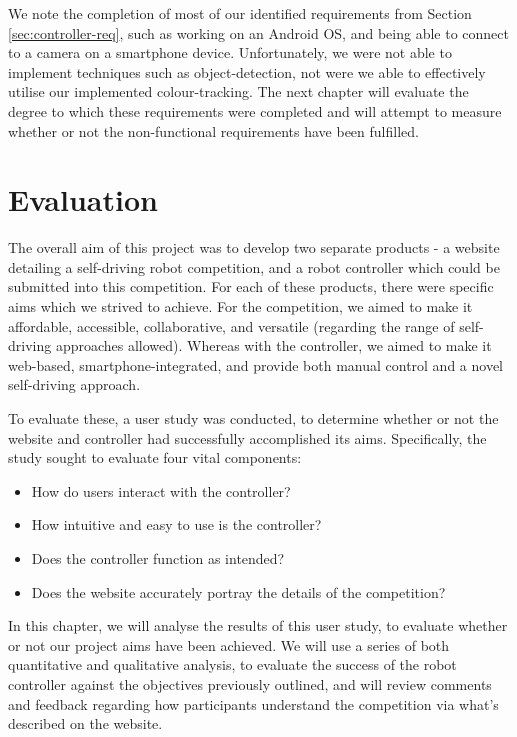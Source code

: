 \documentclass{l4proj}
\begin{document}
We note the completion of most of our identified requirements from Section \ref{sec:controller-req}, such as working on an Android OS, and being able to connect to a camera on a smartphone device. Unfortunately, we were not able to implement techniques such as object-detection, not were we able to effectively utilise our implemented colour-tracking. The next chapter will evaluate the degree to which these requirements were completed and will attempt to measure whether or not the non-functional requirements have been fulfilled.

\chapter{Evaluation}\label{sec:evaluation}
The overall aim of this project was to develop two separate products - a website detailing a self-driving robot competition, and a robot controller which could be submitted into this competition. For each of these products, there were specific aims which we strived to achieve. For the competition, we aimed to make it affordable, accessible, collaborative, and versatile (regarding the range of self-driving approaches allowed). Whereas with the controller, we aimed to make it web-based, smartphone-integrated, and provide both manual control and a novel self-driving approach.

To evaluate these, a user study was conducted, to determine whether or not the website and controller had successfully accomplished its aims. Specifically, the study sought to evaluate four vital components:
\begin{itemize}
    \item How do users interact with the controller?
    \item How intuitive and easy to use is the controller?
    \item Does the controller function as intended?
    \item Does the website accurately portray the details of the competition?
\end{itemize}

In this chapter, we will analyse the results of this user study, to evaluate whether or not our project aims have been achieved. We will use a series of both quantitative and qualitative analysis, to evaluate the success of the robot controller against the objectives previously outlined, and will review comments and feedback regarding how participants understand the competition via what’s described on the website.
\end{document}
